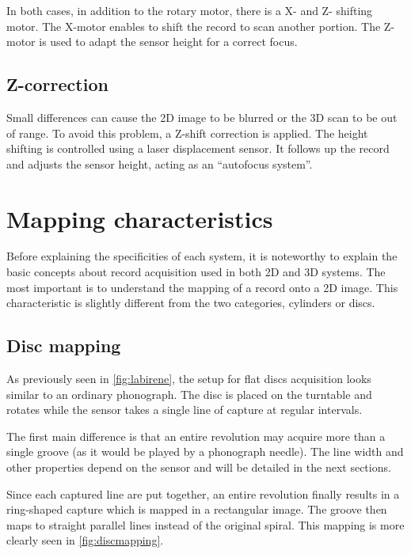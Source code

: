 In both cases, in addition to the rotary motor, there is a X- and Z- shifting motor. The X-motor enables to shift the record to scan another portion. The Z-motor is used to adapt the sensor height for a correct focus.

\subsection{Z-correction}
\label{sec:zcorr}

Small differences can cause the 2D image to be blurred or the 3D scan to be out of range. To avoid this problem, a Z-shift correction is applied. The height shifting is controlled using a laser displacement sensor. It follows up the record and adjusts the sensor height, acting as an ``autofocus system''.

\section{Mapping characteristics}
\label{sec:mapping}

Before explaining the specificities of each system, it is noteworthy to explain the basic concepts about record acquisition used in both 2D and 3D systems. The most important is to understand the mapping of a record onto a 2D image. This characteristic is slightly different from the two categories, cylinders or discs.

\subsection{Disc mapping}

As previously seen in \autoref{fig:labirene}, the setup for flat discs acquisition looks similar to an ordinary phonograph. The disc is placed on the turntable and rotates while the sensor takes a single line of capture at regular intervals.

The first main difference is that an entire revolution may acquire more than a single groove (as it would be played by a phonograph needle). The line width and other properties depend on the sensor and will be detailed in the next sections.

Since each captured line are put together, an entire revolution finally results in a ring-shaped capture which is mapped in a rectangular image. The groove then maps to straight parallel lines instead of the original spiral. This mapping is more clearly seen in \autoref{fig:discmapping}.

